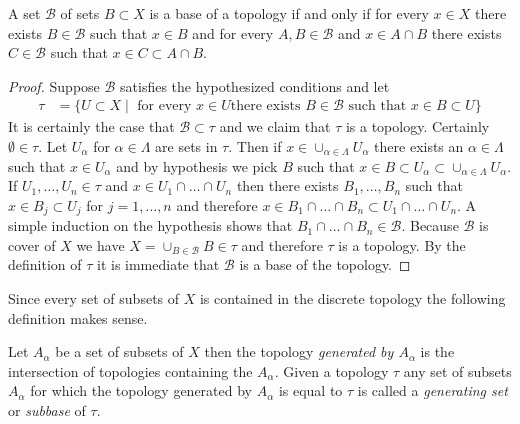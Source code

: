 \begin{lem}\label{CharacterizeBaseOfTopology}A set $\mathcal{B}$ of sets $B \subset X$ is a base of a
  topology if and only if for every $x \in X$ there exists $B \in
  \mathcal{B}$ such that $x \in B$ and for every $A, B \in
  \mathcal{B}$ and $x \in A \cap B$ there exists $C \in \mathcal{B}$
  such that $x \in C \subset A \cap B$.
\end{lem}
\begin{proof}
Suppose $\mathcal{B}$ satisfies the hypothesized conditions and let
\begin{align*}
\tau &= \lbrace U \subset X \mid \text { for every } x \in U \text{
  there exists } B \in \mathcal{B} \text{ such that } x \in B \subset
U \rbrace
\end{align*}
It is certainly the case that $\mathcal{B}\subset \tau$ and we claim that $\tau$ is a topology.  Certainly $\emptyset \in \tau$.
Let $U_\alpha$ for $\alpha \in \Lambda$ are sets in $\tau$.
Then if $x \in \cup_{\alpha \in \Lambda} U_\alpha$ there exists an
$\alpha \in \Lambda$ such that $x \in U_\alpha$ and by hypothesis we
pick $B$ such that $x \in B \subset U_\alpha \subset  \cup_{\alpha \in
  \Lambda} U_\alpha$.  If $U_1, \dotsc, U_n \in \tau$ and $x \in U_1
\cap \dotsc \cap U_n$ then there exists $B_1, \dotsc, B_n$ such that
$x \in B_j \subset U_j$ for $j = 1, \dotsc, n$ and therefore $x \in
B_1 \cap \dotsc \cap B_n \subset U_1 \cap \dotsc \cap U_n$.  A simple
induction on the hypothesis shows that $B_1 \cap \dotsc \cap B_n \in \mathcal{B}$.
Because $\mathcal{B}$ is cover of $X$ we have $X = \cup_{B \in
  \mathcal{B}} B \in \tau$ and therefore $\tau$ is a topology.  By the
definition of $\tau$ it is immediate that $\mathcal{B}$ is a base of
the topology.
\end{proof}


Since every set of subsets of $X$ is contained in the discrete topology the following definition makes sense.
\begin{defn}Let $A_\alpha$ be a set of subsets of $X$ then the topology \emph{generated by $A_\alpha$} is the intersection of topologies containing the $A_\alpha$.  Given a topology $\tau$ any 
set of subsets $A_\alpha$ for which the topology generated by $A_\alpha$ is equal to $\tau$ is called a \emph{generating set} or \emph{subbase} of $\tau$.
\end{defn}

